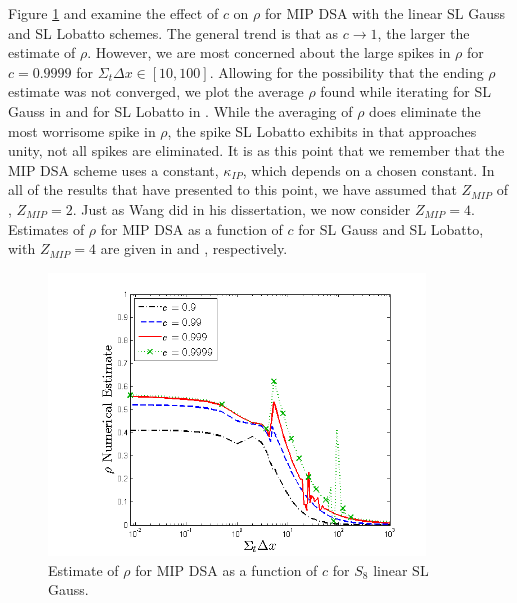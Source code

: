Figure \ref{fig:mip_gauss_as_fun_c} and  examine the effect of $c$ on $\rho$ for MIP DSA with the linear SL Gauss and SL Lobatto schemes.
The general trend is that as $c\to 1$, the larger the estimate of $\rho$.
However, we are most concerned about the large spikes in $\rho$ for $c=0.9999$ for $\Sigma_t \Delta x \in [10,100]$.
Allowing for the possibility that the ending $\rho$ estimate was not converged, we plot the average $\rho$ found while iterating for SL Gauss in  and for SL Lobatto in .
While the averaging of $\rho$ does eliminate the most worrisome spike in $\rho$, the spike SL Lobatto exhibits in  that approaches unity, not all spikes are  eliminated.  
It is as this point that we remember that the MIP DSA scheme uses a constant, $\kappa_{IP}$, which depends on a chosen constant.  In all of the results that have presented to this point, we have assumed that $Z_{MIP}$ of , $Z_{MIP} =2$.
Just as Wang did in his dissertation\cite{yaqi_dissertation}, we now consider $Z_{MIP}=4$.  
Estimates of $\rho$ for MIP DSA as a function of $c$ for SL Gauss and SL Lobatto, with $Z_{MIP}=4$ are given in  and , respectively.
\begin{figure}[!hbp]
\centering
\includegraphics[width=10cm]{chapter4_acceleration/Const_2_Constant_XS_c_comparions_MIP_Gauss.png}
\caption{Estimate of $\rho$ for MIP DSA as a function of $c$  for  $S_8$  linear SL Gauss.}
\label{fig:mip_gauss_as_fun_c}
\end{figure}
%

